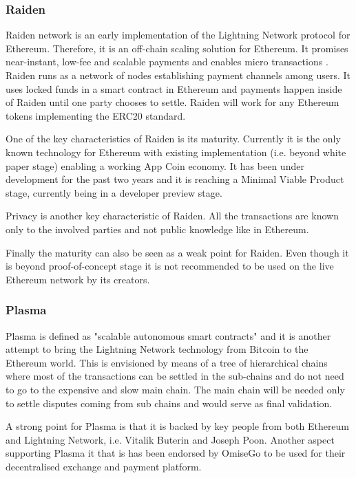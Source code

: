 \subsubsection{Raiden}
Raiden network is an early implementation of the Lightning Network protocol for Ethereum. Therefore, it is an off-chain scaling solution for Ethereum. It promises near-instant, low-fee and scalable payments and enables micro transactions \cite{Raiden}. Raiden runs as a network of nodes establishing payment channels among users. It uses locked funds in a smart contract in Ethereum and payments happen inside of Raiden until one party chooses to settle. Raiden will work for any Ethereum tokens implementing the ERC20 standard.

One of the key characteristics of Raiden is its maturity. Currently it is the only known technology for Ethereum with existing implementation (i.e. beyond white paper stage) enabling a working App Coin economy. It has been under development for the past two years and it is reaching a Minimal Viable Product stage, currently being in a developer preview stage.

Privacy is another key characteristic of Raiden.  All the transactions are known only to the involved parties and not public knowledge like in Ethereum.

Finally the maturity can also be seen as a weak point for Raiden. Even though it is beyond proof-of-concept stage it is not recommended to be used on the live Ethereum network by its creators.

\subsubsection{Plasma}
Plasma is defined as "scalable autonomous smart contracts" \cite{Plasma} and it is another attempt to bring the Lightning Network technology from Bitcoin to the Ethereum world. This is envisioned by means of a tree of hierarchical chains where most of the transactions can be settled in the sub-chains and do not need to go to the expensive and slow main chain. The main chain will be needed only to settle disputes coming from sub chains and would serve as final validation.

A strong point for Plasma is that it is backed by key people from both Ethereum and Lightning Network, i.e. Vitalik Buterin and Joseph Poon. Another aspect supporting Plasma it that is has been endorsed by OmiseGo to be used for their decentralised exchange and payment platform\cite{omisego_plasma}.

